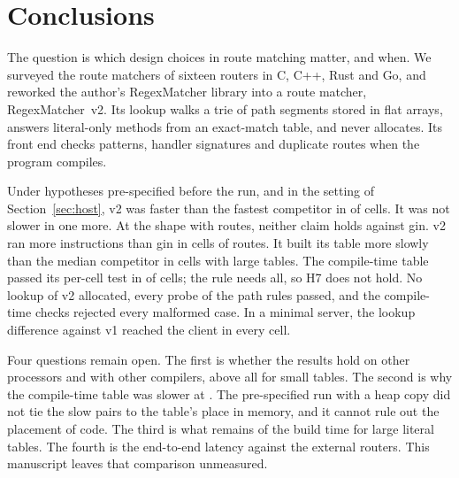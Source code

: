 \section{Conclusions}\label{sec:conclusions}

The question is which design choices in route matching matter, and when.
We surveyed the route matchers of sixteen routers in C, C++, Rust and Go, and reworked the author's
RegexMatcher library into a route matcher, RegexMatcher~v2. Its lookup walks a trie of path segments
stored in flat arrays, answers literal-only methods from an exact-match table, and never allocates.
Its front end checks patterns, handler signatures and duplicate routes when the program compiles.

Under hypotheses pre-specified before the run, and in the setting of Section~\ref{sec:host}, v2 was
faster than the fastest competitor in \HOneSuperior{} of \HOneCells{} cells. It was not slower in
one more. At the  shape with \SizeTen{} routes, neither claim holds against gin. v2 ran more
instructions than gin in \HTwoLost{} cells of \SizeTen{} routes. It built its table more slowly than
the median competitor in \HFourLostBuild{} cells with large tables. The compile-time table passed its
per-cell test in \HSevenHeld{} of \HSevenCells{} cells; the rule needs all, so H7 does not hold. No
lookup of v2 allocated, every probe of the path rules passed, and the compile-time checks rejected
every malformed case. In a minimal server, the lookup difference against v1 reached the client in
every cell.

Four questions remain open. The first is whether the results hold on other processors and with other
compilers, above all for small tables. The second is why the compile-time table was slower at
\HSevenLostCell. The pre-specified run with a heap copy did not tie the slow pairs to the table's
place in memory, and it cannot rule out the placement of code. The third is what remains of the build
time for large literal tables. The fourth is the end-to-end latency against the external routers.
This manuscript leaves that comparison unmeasured.
